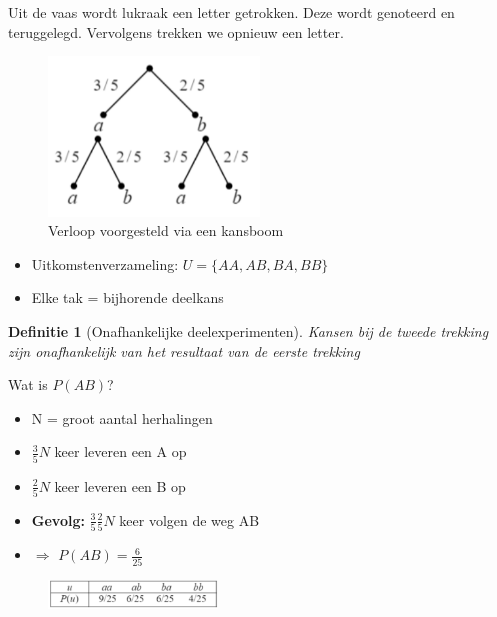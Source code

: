 \documentclass{article}
\newtheorem{theorem}{Definitie}[section]
\begin{document}
Uit de vaas wordt lukraak een letter getrokken. Deze wordt genoteerd
en teruggelegd. Vervolgens trekken we opnieuw een letter.

\begin{figure}[H]
    \centering
    \includegraphics[width=0.5\textwidth]{trekking-met-teruglegging-kansboom.png}
    \caption{Verloop voorgesteld via een kansboom}
\end{figure}

\begin{itemize}
    \item Uitkomstenverzameling: $U = \{AA, AB, BA, BB\}$
    \item Elke tak = bijhorende deelkans
\end{itemize}

\begin{theorem}[Onafhankelijke deelexperimenten]
    Kansen bij de tweede trekking zijn onafhankelijk van het resultaat van de eerste trekking
\end{theorem}

Wat is $P(AB)$?

\begin{itemize}
    \item N = groot aantal herhalingen
    \item $\frac{3}{5}N$ keer leveren een A op
    \item $\frac{2}{5}N$ keer leveren een B op
    \item \textbf{Gevolg:} $\frac35 \frac25 N$ keer volgen de weg AB
    \item $\Rightarrow$ $P(AB) = \frac{6}{25}$
\end{itemize}

\begin{figure}[H]
    \centering
    \includegraphics[width=0.4\textwidth]{trekking-met-teruglegging-tabel.png}
\end{figure}
\end{document}
